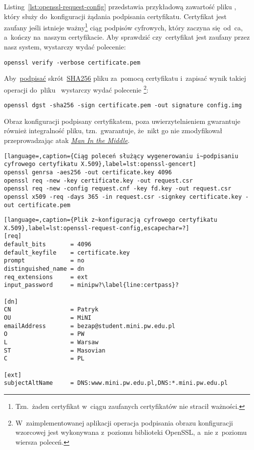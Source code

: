 \documentclass[thesis]{subfiles}
\begin{document}
Listing~\ref{lst:openssl-request-config} przedstawia przykładową zawartość pliku , który służy do~konfiguracji żądania podpisania certyfikatu. Certyfikat jest zaufany jeśli istnieje ważny\footnote{Tzn.~żaden certyfikat w~ciągu zaufanych certyfikatów nie stracił ważności.} ciąg podpisów cyfrowych, który zaczyna się~od~\gls{ca}, a~kończy na~naszym certyfikacie. Aby sprawdzić czy~certyfikat jest zaufany przez nasz system, wystarczy wydać polecenie:\mynobreakpar

\begin{center}
	\texttt{openssl verify -verbose certificate.pem}
\end{center}

Aby~\href{http://stackoverflow.com/questions/10782826/digital-signature-for-a-file-using-openssl}{podpisać} skrót~\href{https://en.wikipedia.org/wiki/SHA-2}{SHA256} pliku  za~pomocą certyfikatu  i~zapisać wynik takiej operacji do~pliku~ wystarczy wydać polecenie \footnote{W~zaimplementowanej aplikacji operacja podpisania obrazu konfiguracji wzorcowej jest wykonywana z~poziomu biblioteki OpenSSL, a~nie z~poziomu wiersza poleceń.}:\mynobreakpar

\begin{center}
	\texttt{openssl dgst -sha256 -sign certificate.pem -out signature config.img}
\end{center}

Obraz konfiguracji podpisany certyfikatem, poza uwierzytelnieniem gwarantuje również integralność pliku, tzn.~gwarantuje, że~nikt go nie zmodyfikował przeprowadzając atak \emph{\hyperlink{itm:mitm}{Man In the Middle}}.

\begin{minipage}{\linewidth} %
\begin{lstlisting}[language=,caption={Ciąg poleceń służący wygenerowaniu i~podpisaniu cyfrowego certyfikatu X.509},label=lst:openssl-gencert]
openssl genrsa -aes256 -out certificate.key 4096
openssl req -new -key certificate.key -out request.csr
openssl req -new -config request.cnf -key fd.key -out request.csr
openssl x509 -req -days 365 -in request.csr -signkey certificate.key -out certificate.pem
\end{lstlisting}
\end{minipage}

\begin{lstlisting}[language=,caption={Plik z~konfiguracją cyfrowego certyfikatu X.509},label=lst:openssl-request-config,escapechar=?]
[req]
default_bits       = 4096
default_keyfile    = certificate.key
prompt             = no
distinguished_name = dn
req_extensions     = ext
input_password     = minipw?\label{line:certpass}?

[dn]
CN                 = Patryk
OU                 = MiNI
emailAddress       = bezap@student.mini.pw.edu.pl
O                  = PW
L                  = Warsaw
ST                 = Masovian
C                  = PL

[ext]
subjectAltName     = DNS:www.mini.pw.edu.pl,DNS:*.mini.pw.edu.pl
\end{lstlisting}
\end{document}
